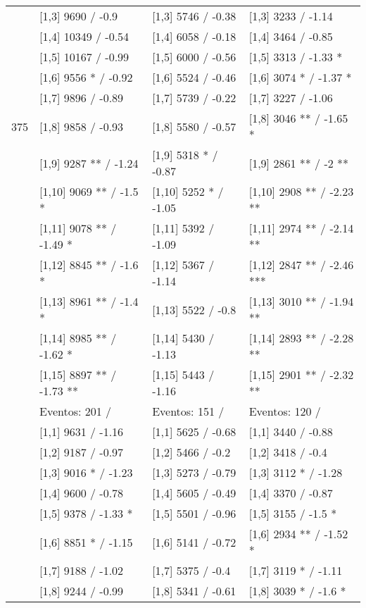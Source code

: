 \begin{table}
\begin{tabular}[t]{llll}
 & {}[1,3] 9690  / -0.9 & {}[1,3] 5746  / -0.38 & {}[1,3] 3233  / -1.14\\
\addlinespace
 & {}[1,4] 10349  / -0.54 & {}[1,4] 6058  / -0.18 & {}[1,4] 3464  / -0.85\\
 & {}[1,5] 10167  / -0.99 & {}[1,5] 6000  / -0.56 & {}[1,5] 3313  / -1.33 *\\
 & {}[1,6] 9556 * / -0.92 & {}[1,6] 5524  / -0.46 & {}[1,6] 3074 * / -1.37 *\\
 & {}[1,7] 9896  / -0.89 & {}[1,7] 5739  / -0.22 & {}[1,7] 3227  / -1.06\\
375 & {}[1,8] 9858  / -0.93 & {}[1,8] 5580  / -0.57 & {}[1,8] 3046 ** / -1.65 *\\
\addlinespace
 & {}[1,9] 9287 ** / -1.24 & {}[1,9] 5318 * / -0.87 & {}[1,9] 2861 ** / -2 **\\
 & {}[1,10] 9069 ** / -1.5 * & {}[1,10] 5252 * / -1.05 & {}[1,10] 2908 ** / -2.23 **\\
 & {}[1,11] 9078 ** / -1.49 * & {}[1,11] 5392  / -1.09 & {}[1,11] 2974 ** / -2.14 **\\
 & {}[1,12] 8845 ** / -1.6 * & {}[1,12] 5367  / -1.14 & {}[1,12] 2847 ** / -2.46 ***\\
 & {}[1,13] 8961 ** / -1.4 * & {}[1,13] 5522  / -0.8 & {}[1,13] 3010 ** / -1.94 **\\
\addlinespace
 & {}[1,14] 8985 ** / -1.62 * & {}[1,14] 5430  / -1.13 & {}[1,14] 2893 ** / -2.28 **\\
 & {}[1,15] 8897 ** / -1.73 ** & {}[1,15] 5443  / -1.16 & {}[1,15] 2901 ** / -2.32 **\\
 & Eventos:  201 / & Eventos:  151 / & Eventos:  120 /\\
 & {}[1,1] 9631  / -1.16 & {}[1,1] 5625  / -0.68 & {}[1,1] 3440  / -0.88\\
 & {}[1,2] 9187  / -0.97 & {}[1,2] 5466  / -0.2 & {}[1,2] 3418  / -0.4\\
\addlinespace
 & {}[1,3] 9016 * / -1.23 & {}[1,3] 5273  / -0.79 & {}[1,3] 3112 * / -1.28\\
 & {}[1,4] 9600  / -0.78 & {}[1,4] 5605  / -0.49 & {}[1,4] 3370  / -0.87\\
 & {}[1,5] 9378  / -1.33 * & {}[1,5] 5501  / -0.96 & {}[1,5] 3155  / -1.5 *\\
 & {}[1,6] 8851 * / -1.15 & {}[1,6] 5141  / -0.72 & {}[1,6] 2934 ** / -1.52 *\\
 & {}[1,7] 9188  / -1.02 & {}[1,7] 5375  / -0.4 & {}[1,7] 3119 * / -1.11\\
\addlinespace
500 & {}[1,8] 9244  / -0.99 & {}[1,8] 5341  / -0.61 & {}[1,8] 3039 * / -1.6 *\\

\end{tabular}
\end{table}
